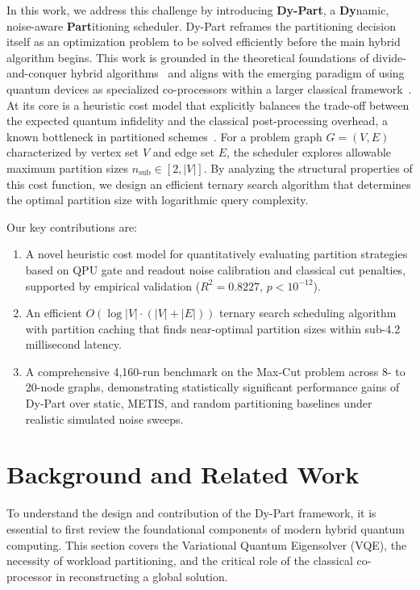 \documentclass[pdflatex,sn-mathphys-num]{sn-jnl}
\theoremstyle{thmstyleone}
\theoremstyle{thmstyletwo}%
\theoremstyle{thmstylethree}%
\begin{document}
In this work, we address this challenge by introducing \textbf{Dy-Part}, a \textbf{Dy}namic, noise-aware \textbf{Part}itioning scheduler. Dy-Part reframes the partitioning decision itself as an optimization problem to be solved efficiently before the main hybrid algorithm begins. This work is grounded in the theoretical foundations of divide-and-conquer hybrid algorithms~\cite{Ge2019AHAI} and aligns with the emerging paradigm of using quantum devices as specialized co-processors within a larger classical framework~\cite{Wurtz2024SolvingNCB, Osaba2024HybridQSY}. At its core is a heuristic cost model that explicitly balances the trade-off between the expected quantum infidelity and the classical post-processing overhead, a known bottleneck in partitioned schemes~\cite{Bhatotia2024QuantumClassicalCVH}. For a problem graph $G = (V, E)$ characterized by vertex set $V$ and edge set $E$, the scheduler explores allowable maximum partition sizes $n_{\text{sub}} \in [2, |V|]$. By analyzing the structural properties of this cost function, we design an efficient ternary search algorithm that determines the optimal partition size with logarithmic query complexity.

Our key contributions are:
\begin{enumerate}
    \item A novel heuristic cost model for quantitatively evaluating partition strategies based on QPU gate and readout noise calibration and classical cut penalties, supported by empirical validation ($R^2 = 0.8227$, $p < 10^{-12}$).
    \item An efficient $O(\log |V| \cdot (|V| + |E|))$ ternary search scheduling algorithm with partition caching that finds near-optimal partition sizes within sub-4.2 millisecond latency.
    \item A comprehensive 4,160-run benchmark on the Max-Cut problem across 8- to 20-node graphs, demonstrating statistically significant performance gains of Dy-Part over static, METIS, and random partitioning baselines under realistic simulated noise sweeps.
\end{enumerate}


\section{Background and Related Work}\label{sec2}

To understand the design and contribution of the Dy-Part framework, it is essential to first review the foundational components of modern hybrid quantum computing. This section covers the Variational Quantum Eigensolver (VQE), the necessity of workload partitioning, and the critical role of the classical co-processor in reconstructing a global solution.
\end{document}
